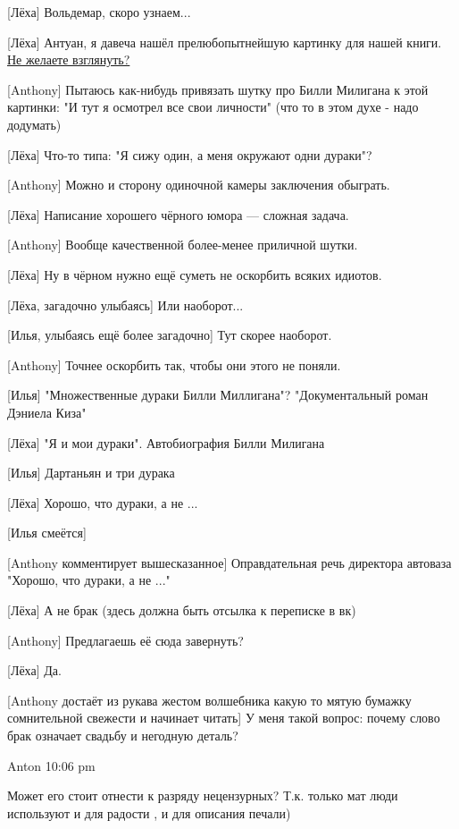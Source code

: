 [Лёха]
Вольдемар, скоро узнаем...


[Лёха]
Антуан, я давеча нашёл прелюбопытнейшую картинку для нашей книги. \href{http://cs8.pikabu.ru/post_img/2016/10/14/5/1476431396146890414.jpg}{Не желаете взглянуть?}


[Anthony]
Пытаюсь как-нибудь привязать шутку про Билли Милигана к этой картинки: "И тут я осмотрел все свои личности" (что то в этом духе - надо додумать)


[Лёха]
Что-то типа: "Я сижу один, а меня окружают одни дураки"?


[Anthony]
Можно и сторону одиночной камеры заключения обыграть.


[Лёха]
Написание хорошего чёрного юмора — сложная задача.


[Anthony]
Вообще качественной более-менее приличной шутки.


[Лёха]
Ну в чёрном нужно ещё суметь не оскорбить всяких идиотов.


[Лёха, загадочно улыбаясь]
Или наоборот...


[Илья, улыбаясь ещё более загадочно]
Тут скорее наоборот.


[Anthony]
Точнее оскорбить так, чтобы они этого не поняли.


[Илья]
"Множественные дураки Билли Миллигана"?
"Документальный роман Дэниела Киза"


[Лёха]
"Я и мои дураки". Автобиография Билли Милигана


[Илья]
Дартаньян и три дурака


[Лёха]
Хорошо, что дураки, а не ...


[Илья смеётся]


[Anthony комментирует вышесказанное]
Оправдательная речь директора автоваза
"Хорошо, что дураки, а не ..."


[Лёха]
А не брак (здесь должна быть отсылка к переписке в вк) %


[Anthony]
Предлагаешь её сюда завернуть?


[Лёха]
Да.


[Anthony достаёт из рукава жестом волшебника какую то мятую бумажку сомнительной свежести и начинает читать]
У меня такой вопрос: почему слово брак означает свадьбу и негодную деталь?

Anton 10:06 pm

    Может его стоит отнести к разряду нецензурных? Т.к. только мат люди используют и для радости , и для описания печали)

